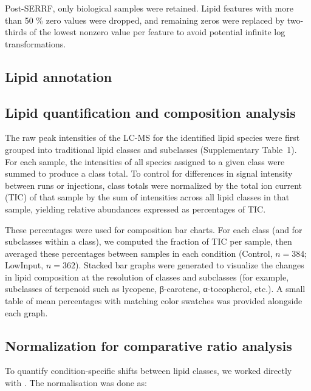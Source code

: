 \documentclass[10pt,letterpaper]{article}
\begin{document}
Post-SERRF, only biological samples were retained. Lipid features with more than 50 \% zero values were dropped, and remaining zeros were replaced by two-thirds of the lowest nonzero value per feature to avoid potential infinite log transformations.


\subsection*{Lipid annotation}

\subsection*{Lipid quantification and composition analysis}
The raw peak intensities of the LC-MS for the identified lipid species were first grouped into traditional lipid classes and subclasses (Supplementary Table~1). For each sample, the intensities of all species assigned to a given class were summed to produce a class total. To control for differences in signal intensity between runs or injections, class totals were normalized by the total ion current (TIC) of that sample by the sum of intensities across all lipid classes in that sample, yielding relative abundances expressed as percentages of TIC.  

These percentages were used for composition bar charts. For each class (and for subclasses within a class), we computed the fraction of TIC per sample, then averaged these percentages between samples in each condition (Control, $n=384$; LowInput, $n=362$). Stacked bar graphs were generated to visualize the changes in lipid composition at the resolution of classes and subclasses (for example, subclasses of terpenoid such as lycopene, β-carotene, α-tocopherol, etc.). A small table of mean percentages with matching color swatches was provided alongside each graph.

\subsection*{Normalization for comparative ratio analysis}

To quantify condition-specific shifts between lipid classes, we worked directly with 
.  
The normalisation was done as:
\end{document}
